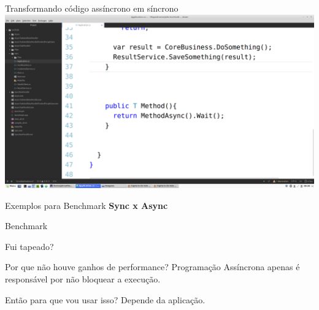 \documentclass[10pt]{beamer}
\begin{document}
\begin{frame}{Transformando código assíncrono em síncrono}
	\includegraphics[width=\textwidth]{imgs/03-asyncToSync.png}
\end{frame}

\begin{frame}{Exemplos para Benchmark}
	\textbf{Sync x Async}
\end{frame}


\begin{frame}{Benchmark}
	\begin{figure}
	\end{figure}
\end{frame}

\begin{frame}{Fui tapeado?}
	\begin{alertblock}{Por que não houve ganhos de performance?}
		Programação Assíncrona apenas é responsável por não bloquear a execução.
	\end{alertblock}
	\begin{exampleblock}{Então para que vou usar isso?}
		Depende da aplicação.
	\end{exampleblock}
\end{frame}
\end{document}
